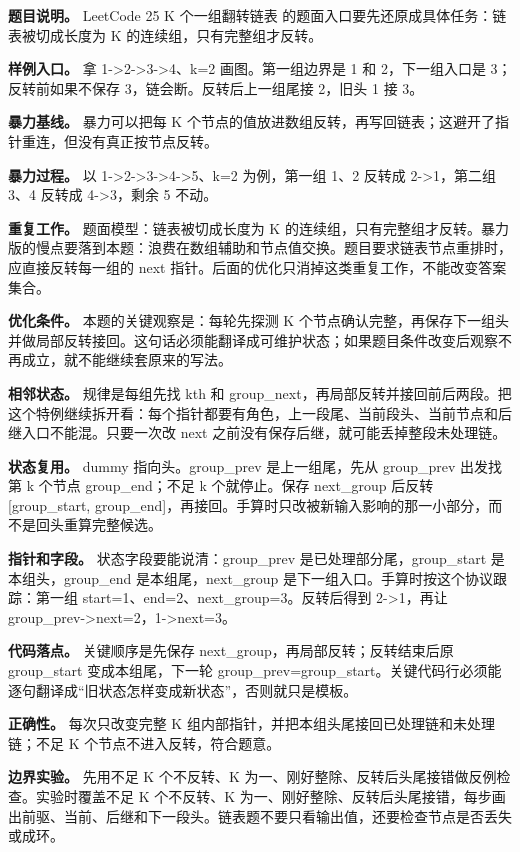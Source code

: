 \textbf{题目说明。} LeetCode 25 K 个一组翻转链表 的题面入口要先还原成具体任务：链表被切成长度为 K 的连续组，只有完整组才反转。

\textbf{样例入口。} 拿 1->2->3->4、k=2 画图。第一组边界是 1 和 2，下一组入口是 3；反转前如果不保存 3，链会断。反转后上一组尾接 2，旧头 1 接 3。

\textbf{暴力基线。} 暴力可以把每 K 个节点的值放进数组反转，再写回链表；这避开了指针重连，但没有真正按节点反转。

\textbf{暴力过程。} 以 1->2->3->4->5、k=2 为例，第一组 1、2 反转成 2->1，第二组 3、4 反转成 4->3，剩余 5 不动。

\textbf{重复工作。} 题面模型：链表被切成长度为 K 的连续组，只有完整组才反转。暴力版的慢点要落到本题：浪费在数组辅助和节点值交换。题目要求链表节点重排时，应直接反转每一组的 next 指针。后面的优化只消掉这类重复工作，不能改变答案集合。

\textbf{优化条件。} 本题的关键观察是：每轮先探测 K 个节点确认完整，再保存下一组头并做局部反转接回。这句话必须能翻译成可维护状态；如果题目条件改变后观察不再成立，就不能继续套原来的写法。

\textbf{相邻状态。} 规律是每组先找 kth 和 group\_next，再局部反转并接回前后两段。把这个特例继续拆开看：每个指针都要有角色，上一段尾、当前段头、当前节点和后继入口不能混。只要一次改 next 之前没有保存后继，就可能丢掉整段未处理链。

\textbf{状态复用。} dummy 指向头。group\_prev 是上一组尾，先从 group\_prev 出发找第 k 个节点 group\_end；不足 k 个就停止。保存 next\_group 后反转 [group\_start, group\_end]，再接回。手算时只改被新输入影响的那一小部分，而不是回头重算完整候选。

\textbf{指针和字段。} 状态字段要能说清：group\_prev 是已处理部分尾，group\_start 是本组头，group\_end 是本组尾，next\_group 是下一组入口。手算时按这个协议跟踪：第一组 start=1、end=2、next\_group=3。反转后得到 2->1，再让 group\_prev->next=2，1->next=3。

\textbf{代码落点。} 关键顺序是先保存 next\_group，再局部反转；反转结束后原 group\_start 变成本组尾，下一轮 group\_prev=group\_start。关键代码行必须能逐句翻译成“旧状态怎样变成新状态”，否则就只是模板。

\textbf{正确性。} 每次只改变完整 K 组内部指针，并把本组头尾接回已处理链和未处理链；不足 K 个节点不进入反转，符合题意。

\textbf{边界实验。} 先用不足 K 个不反转、K 为一、刚好整除、反转后头尾接错做反例检查。实验时覆盖不足 K 个不反转、K 为一、刚好整除、反转后头尾接错，每步画出前驱、当前、后继和下一段头。链表题不要只看输出值，还要检查节点是否丢失或成环。

